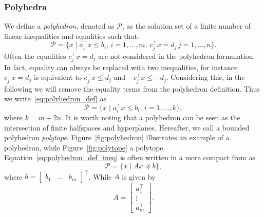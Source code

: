 \subsubsection{Polyhedra \label{sec:polyhedra}}
We define a \emph{polyhedron}, denoted as $\mathcal{P}$, as the solution set of a finite number of linear inequalities and equalities such that:
\begin{equation}
    \label{eq:polyhedron_def}
    \mathcal{P} = \{ x \; | \; a_i ^\top x \le b_i, \, i = 1, \dots, m, \,  c_j ^\top x = d_j \, j = 1,\dots,n\}.
\end{equation}
Often the equalities $c_j ^\top x = d_j$ are not considered in the polyhedron formulation. In fact, equality can always be replaced with two inequalities, for instance $c_j ^\top x = d_j$ is equivalent to $c_j ^\top x \le d_j$ and $-c_j ^\top x \le -d_j$. Considering this, in the following we will remove the equality terms from the polyhedron definition. Thus we write~\eqref{eq:polyhedron_def} as
\begin{equation}
    \label{eq:polyhedron_def_ineq}
    \mathcal{P} = \{ x \; | \; a_i ^\top x \le b_i, \, i = 1, \dots, k \},
\end{equation}
where $k = m + 2 n$.
It is worth noting that a polyhedron can be seen as the intersection of finite halfspaces and hyperplanes. Hereafter, we call a bounded polyhedron \emph{polytope}.
Figure~\ref{fig:polyhedron} illustrates an example of a polyhedron, while Figure~\ref{fig:polytope} a polytope.
Equation~\eqref{eq:polyhedron_def_ineq} is often written in a more compact from as
\begin{equation}
    \label{eq:polyhedron_def_compact}
    \mathcal{P} = \{ x \; | \; A x \preceq b \},
\end{equation}
where $b = \begin{bmatrix}
b_1& \hdots & b_m
\end{bmatrix}^\top$. While $A$ is given by
\begin{equation}
    A = \begin{bmatrix}
        a_1^\top \\
        \vdots \\
        a_m^\top
    \end{bmatrix}. 
\end{equation}

